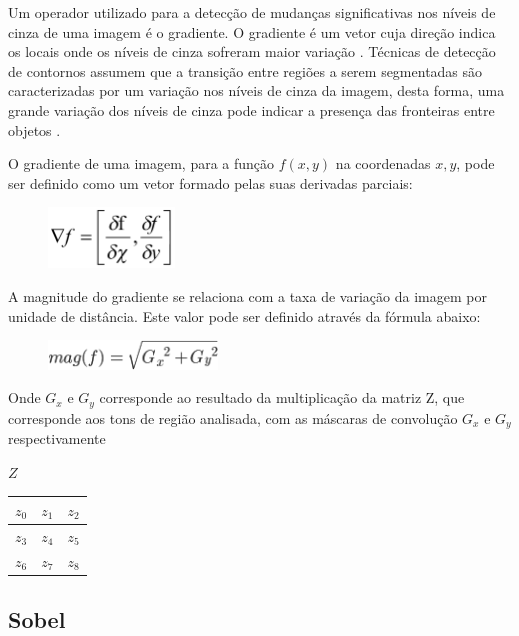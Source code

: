 \documentclass[
	12pt,				%
	oneside,			%
	a4paper,			%
	english,			%
	french,				%
	spanish,			%
	brazil,				%
	]{abntex2}
\begin{document}
Um operador utilizado para a detecção de mudanças significativas nos níveis de cinza de uma imagem é o gradiente. O gradiente é um vetor cuja direção indica os locais onde os níveis de cinza sofreram maior variação \cite{pedriniSchwartz:2008}. Técnicas de detecção de contornos assumem que a transição entre regiões a serem segmentadas são caracterizadas por um variação nos níveis de cinza da imagem, desta forma, uma grande variação dos níveis de cinza pode indicar a presença das fronteiras entre objetos \cite{conciAzevedoLeta:2008}. 

O gradiente de uma imagem, para a função \(f(x,y)\) na coordenadas \(x,y\), pode ser definido como um vetor formado pelas suas derivadas parciais:

\begin{figure}[ht]
\centering
\includegraphics[width=0.3\textwidth]{imagens/gradiente.png}
\end{figure}

A magnitude do gradiente se relaciona com a taxa de variação da imagem por unidade de distância. Este valor pode ser definido através da fórmula abaixo:

\begin{figure}[ht]
\centering
\includegraphics[width=0.4\textwidth]{imagens/magnitude.png}
\end{figure}


Onde \(G_x\) e \(G_y\) corresponde ao resultado da multiplicação da matriz Z, que corresponde aos tons de região analisada, com as máscaras de convolução \(G_x\) e \(G_y\) respectivamente

\(Z\)
\begin{tabular}{|c|c|c|}
	\hline
    \(z_0\) & \(z_1\) & \(z_2\)   \\ \hline
	\(z_3\) & \(z_4\) & \(z_5\)   \\ \hline   
	\(z_6\) & \(z_7\) & \(z_8\)   \\ \hline   
\end{tabular}

\subsection{Sobel}
\end{document}
